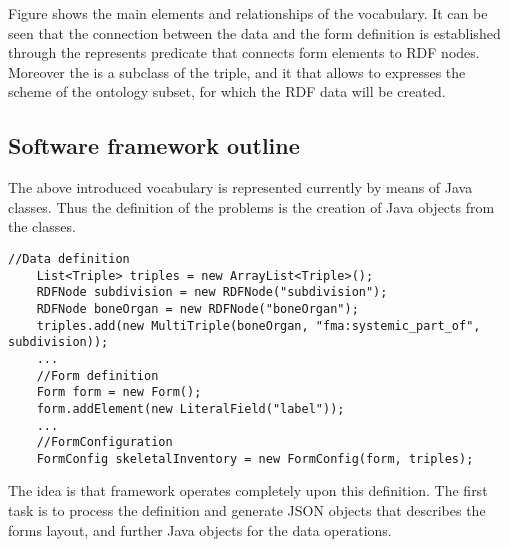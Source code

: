

Figure  shows the main elements and relationships of the vocabulary. It can be seen that the connection between the data and the form definition is established through the represents predicate that connects form elements to RDF nodes. Moreover the  is a subclass of the triple, and it that allows to expresses the scheme of the ontology subset, for which the RDF data will be created.


\subsection{Software framework outline} \label{[332}


The above introduced vocabulary is represented currently by means of Java classes. Thus the definition of the problems is the creation of Java objects from the classes. 


\begin{lstlisting}[captionpos=b, caption=Input process definition in Java, label={sparqlExisting},
basicstyle=\footnotesize,frame=single]
	//Data definition
	List<Triple> triples = new ArrayList<Triple>();
	RDFNode subdivision = new RDFNode("subdivision");
	RDFNode boneOrgan = new RDFNode("boneOrgan");
	triples.add(new MultiTriple(boneOrgan, "fma:systemic_part_of", subdivision));
	...
	//Form definition
	Form form = new Form();
	form.addElement(new LiteralField("label"));
	...
	//FormConfiguration
	FormConfig skeletalInventory = new FormConfig(form, triples);
\end{lstlisting}


The idea is that framework operates completely upon this definition. The first task is to process the definition and generate JSON objects that describes the forms layout, and further Java objects for the data operations.




